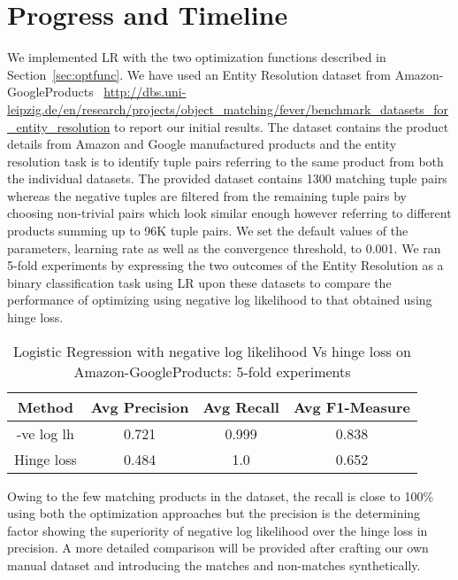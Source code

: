 \section{Progress and Timeline}
\label{sec:timeline}
We implemented LR with the two optimization functions described in Section~\ref{sec:optfunc}. We have used an Entity Resolution dataset from Amazon-GoogleProducts~\cite{ERdataset} \url{http://dbs.uni-leipzig.de/en/research/projects/object_matching/fever/benchmark_datasets_for_entity_resolution} to report our initial results. The dataset contains the product details from Amazon and Google manufactured products and the entity resolution task is to identify tuple pairs referring to the same product from both the individual datasets. The provided dataset contains 1300 matching tuple pairs whereas the negative tuples are filtered from the remaining tuple pairs by choosing non-trivial pairs which look similar enough however referring to different products summing up to 96K tuple pairs. We set the default values of the parameters, learning rate as well as the convergence threshold, to 0.001. We ran 5-fold experiments by expressing the two outcomes of the Entity Resolution as a binary classification task using LR upon these datasets to compare the performance of optimizing using negative log likelihood to that obtained using hinge loss.

\begin{table}[htb]
\caption{Logistic Regression with negative log likelihood Vs hinge loss on Amazon-GoogleProducts: 5-fold experiments}
\centering
\begin{tabular}{c c c c}
\hline\hline
Method & Avg Precision & Avg Recall & Avg F1-Measure \\ [0.5ex] %
\hline
-ve log lh&0.721&0.999&0.838 \\
Hinge loss&0.484&1.0&0.652 \\ [1ex]
\hline
\end{tabular}
\label{table:hingevsloglh}
\end{table}

Owing to the few matching products in the dataset, the recall is close to 100\% using both the optimization approaches but the precision is the determining factor showing the superiority of negative log likelihood over the hinge loss in precision. A more detailed comparison will be provided after crafting our own manual dataset and introducing the matches and non-matches synthetically. 

